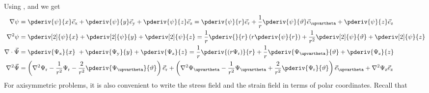 Using ,  and  we get
\begin{align}
	\nabla\psi &= \pderiv{\psi}{x}\vec{e}_{\mathrm{x}} + \pderiv{\psi}{y}\vec{e}_{\mathrm{y}} + \pderiv{\psi}{z}\vec{e}_{\mathrm{z}} = \pderiv{\psi}{r}\vec{e}_{\mathrm{r}}+\frac{1}{r}\pderiv{\psi}{\vartheta}\vec{e}_{\upvartheta}+\pderiv{\psi}{z}\vec{e}_{\mathrm{z}} \label{Eq2:delScalarCyl} \\	
	\nabla^2\psi &= \pderiv[2]{\psi}{x} + \pderiv[2]{\psi}{y} + \pderiv[2]{\psi}{z} = \frac{1}{r}\pderiv{}{r}\left(r\pderiv{\psi}{r}\right) + \frac{1}{r^2}\pderiv[2]{\psi}{\vartheta} +\pderiv[2]{\psi}{z}\\
	\nabla\cdot\vec{\Psi} &= \pderiv{\Psi_{\mathrm{x}}}{x}\ + \pderiv{\Psi_{\mathrm{y}}}{y} + \pderiv{\Psi_{\mathrm{z}}}{z} = \frac{1}{r}\pderiv{(r\Psi_{\mathrm{r}})}{r} + \frac{1}{r}\pderiv{\Psi_{\upvartheta}}{\vartheta}+\pderiv{\Psi_{\mathrm{z}}}{z} \label{Eq2:DelDotVecCyl}\\ 
	\nabla^2\vec{\Psi} &= \left(\nabla^2\Psi_{\mathrm{r}} - \frac{1}{r^2}\Psi_{\mathrm{r}}-\frac{2}{r^2}\pderiv{\Psi_{\upvartheta}}{\vartheta}\right)\vec{e}_{\mathrm{r}} + \left(\nabla^2\Psi_{\upvartheta}-\frac{1}{r^2}\Psi_{\upvartheta} + \frac{2}{r^2}\pderiv{\Psi_{\mathrm{r}}}{\vartheta}\right)\vec{e}_{\upvartheta} + \nabla^2\Psi_{\mathrm{z}}\vec{e}_{\mathrm{z}} \label{Eq2:LapVecPotCyl}
\end{align}
For axisymmetric problems, it is also convenient to write the stress field and the strain field in terms of polar coordinates. Recall that
